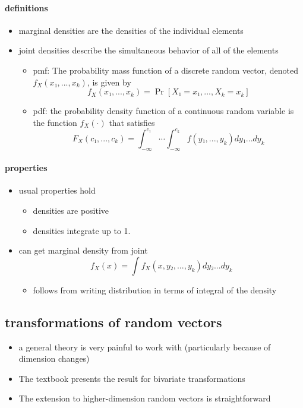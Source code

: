 \paragraph{definitions}
\begin{itemize}
\item marginal densities are the densities of the individual elements
\item joint densities describe the simultaneous behavior of all of
        the elements
\begin{itemize}
\item pmf: The probability mass function of a discrete random vector,
  denoted $f_X(x₁,..., x_k)$, is given by
  \[f_X(x₁,...,x_k) = \Pr[X₁ = x₁,...,X_k = x_k]\]
\item pdf: the probability density function of a continuous random
  variable is the function $f_X(·)$ that satisfies
  \begin{equation*}
    F_X(c₁,...,c_k) = ∫_{-∞}^{c₁} ⋯ ∫_{-∞}^{c_k} f(y₁,...,y_k) dy₁ ... dy_k
  \end{equation*}
\end{itemize}
\end{itemize}

\paragraph{properties}
\begin{itemize}
\item usual properties hold
\begin{itemize}
\item densities are positive
\item densities integrate up to 1.
\end{itemize}
\item can get marginal density from joint
  \[ f_{X}(x) = ∫ f_X(x, y₂,...,y_k) dy₂ ... dy_k \]
\begin{itemize}
\item follows from writing distribution in terms of integral of
          the density
\end{itemize}
\end{itemize}

\subsection{transformations of random vectors}

\begin{itemize}
\item a general theory is very painful to work with (particularly
        because of dimension changes)
\item The textbook presents the result for bivariate transformations
\item The extension to higher-dimension random vectors is
        straightforward
\end{itemize}

